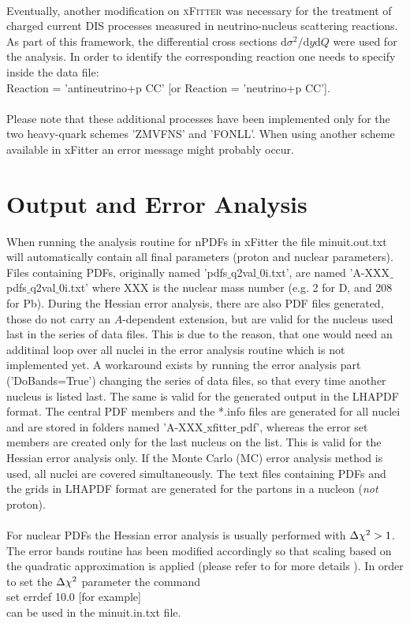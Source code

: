 \documentclass{article}
\newcommand{\Chi}{\large{\chi}}
\begin{document}
\\
Eventually, another modification on \textsc{xFitter} was necessary for the treatment of charged current DIS processes measured in neutrino-nucleus scattering reactions. As part of this framework, the differential cross sections $\mathrm{d}\sigma^2/\mathrm{d}y\mathrm{d}Q$ were used for the analysis. In order to identify the corresponding reaction one needs to specify inside the data file:\\
\hspace*{0.5cm}Reaction = 'antineutrino+p CC' [or Reaction = 'neutrino+p CC'].\\
\\
Please note that these additional processes have been implemented only for the two heavy-quark schemes 'ZMVFNS' and 'FONLL'. When using another scheme available in xFitter an error message might probably occur.


\section{Output and Error Analysis}

When running the analysis routine for nPDFs in xFitter the file minuit.out.txt will automatically contain all final parameters (proton and nuclear parameters). Files containing PDFs, originally named 'pdfs$\_$q2val$\_$0i.txt', are named 'A-XXX$\_$pdfs$\_$q2val$\_$0i.txt' where XXX is the nuclear mass number (e.g. 2 for D, and 208 for Pb). During the Hessian error analysis, there are also PDF files generated, those do not carry an $A$-dependent extension, but are valid for the nucleus used last in the series of data files. This is due to the reason, that one would need an additinal loop over all nuclei in the error analysis routine which is not implemented yet. A workaround exists by running the error analysis part ('DoBands=True') changing the series of data files, so that every time another nucleus is listed last. The same is valid for the generated output in the LHAPDF format. The central PDF members and the *.info files are generated for all nuclei and are stored in folders named 'A-XXX$\_$xfitter$\_$pdf', whereas the error set members are created only for the last nucleus on the list. This is valid for the Hessian error analysis only. If the Monte Carlo (MC) error analysis method is used, all nuclei are covered simultaneously. The text files containing PDFs and the grids in LHAPDF format are generated for the partons in a nucleon (\textit{not} proton). \\
\\
For nuclear PDFs the Hessian error analysis is usually performed with $\Delta \Chi^2 >1$. The error bands routine has been modified accordingly so that scaling based on the quadratic approximation is applied (please refer to \cite{Walt:2019slu} for more details ). In order to set the $\Delta \Chi^2$ parameter the command \\
\hspace*{0.5cm} set errdef 10.0 [for example] \\
can be used in the minuit.in.txt file.
\end{document}

